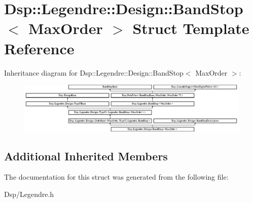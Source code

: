 \hypertarget{structDsp_1_1Legendre_1_1Design_1_1BandStop}{\section{Dsp\-:\-:Legendre\-:\-:Design\-:\-:Band\-Stop$<$ Max\-Order $>$ Struct Template Reference}
\label{structDsp_1_1Legendre_1_1Design_1_1BandStop}
}
Inheritance diagram for Dsp\-:\-:Legendre\-:\-:Design\-:\-:Band\-Stop$<$ Max\-Order $>$\-:\begin{figure}[H]
\begin{center}
\leavevmode
\includegraphics[height=2.419007cm]{structDsp_1_1Legendre_1_1Design_1_1BandStop}
\end{center}
\end{figure}
\subsection*{Additional Inherited Members}


The documentation for this struct was generated from the following file\-:\begin{DoxyCompactItemize}
\item 
Dsp/Legendre.\-h\end{DoxyCompactItemize}
